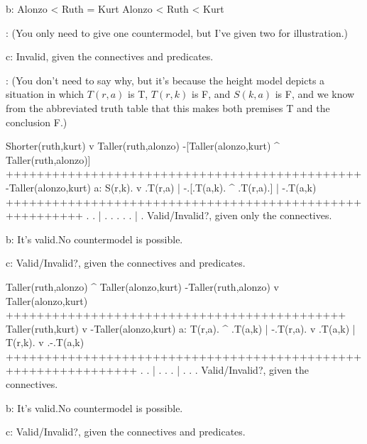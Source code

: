         b:
        \heightmodel
         Alonzo < Ruth = Kurt
        \endheightmodel
        \OR
        \heightmodel
         Alonzo < Ruth < Kurt
        \endheightmodel

:        (You only need to give one countermodel, but I've given two for illustration.)

        c: Invalid, given the connectives and predicates.

:        (You don't need to say why, but it's because the height model depicts a situation in which $T(r,a)$ is T, $T(r,k)$ is F, and $S(k,a)$ is F, and we know from the abbreviated truth table that this makes both premises T and the conclusion F.)

        \endanswerlist

\argument
 Shorter(ruth,kurt) v Taller(ruth,alonzo)
 -[Taller(alonzo,kurt) ^ Taller(ruth,alonzo)]
++++++++++++++++++++++++++++++++++++++++++++++
 -Taller(alonzo,kurt)
\endargument
        \answerlist
        a:
        \truthtable
         S(r,k). v .T(r,a) | -.[.T(a,k). ^ .T(r,a).] | -.T(a,k)
        ++++++++++++++++++++++++++++++++++++++++++++++++++++++++
               .   .       |  . .      .   .      .  |  .
        \endtruthtable
        Valid/Invalid?, given only the connectives.

        b: It's valid.\OR No countermodel is possible.\OR
        \heightmodel
         
        \endheightmodel

        c: Valid/Invalid?, given the connectives and predicates.
        \endanswerlist

\argument
 Taller(ruth,alonzo) ^ Taller(alonzo,kurt)
 -Taller(ruth,alonzo) v Taller(alonzo,kurt)
++++++++++++++++++++++++++++++++++++++++++++
 Taller(ruth,kurt) v -Taller(alonzo,kurt) 
\endargument
        \answerlist
        a:
        \truthtable
         T(r,a). ^ .T(a,k) | -.T(r,a). v .T(a,k) | T(r,k). v .-.T(a,k)
        +++++++++++++++++++++++++++++++++++++++++++++++++++++++++++++++
               .   .       |  .      .   .       |       .   . .
        \endtruthtable
        Valid/Invalid?, given the connectives.

        b: It's valid.\OR No countermodel is possible.\OR
        \heightmodel
         
        \endheightmodel

        c: Valid/Invalid?, given the connectives and predicates.
        \endanswerlist

\endproblems
\bye
